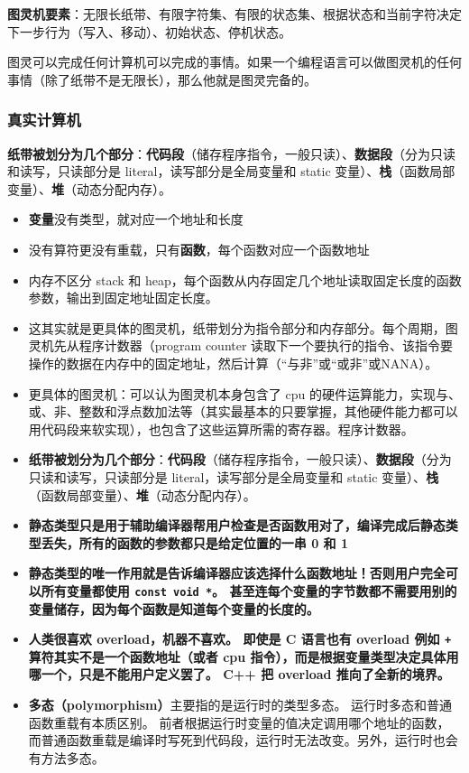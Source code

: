 
\begin{issues}
\issueDraft
\end{issues}


\textbf{图灵机要素}：无限长纸带、有限字符集、有限的状态集、根据状态和当前字符决定下一步行为（写入、移动）、初始状态、停机状态。

图灵可以完成任何计算机可以完成的事情。如果一个编程语言可以做图灵机的任何事情（除了纸带不是无限长），那么他就是图灵完备的。

\subsubsection{真实计算机}
\textbf{纸带被划分为几个部分}：\textbf{代码段}（储存程序指令，一般只读）、\textbf{数据段}（分为只读和读写，只读部分是 literal，读写部分是全局变量和 static 变量）、\textbf{栈}（函数局部变量）、\textbf{堆}（动态分配内存）。

\begin{itemize}
\item \textbf{变量}没有类型，就对应一个地址和长度
\item 没有算符更没有重载，只有\textbf{函数}，每个函数对应一个函数地址
\item 内存不区分 stack 和 heap，每个函数从内存固定几个地址读取固定长度的函数参数，输出到固定地址固定长度。
\item 这其实就是更具体的图灵机，纸带划分为指令部分和内存部分。每个周期，图灵机先从程序计数器（program counter 读取下一个要执行的指令、该指令要操作的数据在内存中的固定地址，然后计算（“与非”或“或非”或NANA）。
\item 更具体的图灵机：可以认为图灵机本身包含了 cpu 的硬件运算能力，实现与、或、非、整数和浮点数加法等（其实最基本的只要掌握，其他硬件能力都可以用代码段来软实现），也包含了这些运算所需的寄存器。程序计数器。
\item \textbf{纸带被划分为几个部分}：\textbf{代码段}（储存程序指令，一般只读）、\textbf{数据段}（分为只读和读写，只读部分是 literal，读写部分是全局变量和 static 变量）、\textbf{栈}（函数局部变量）、\textbf{堆}（动态分配内存）。
\item \textbf{静态类型只是用于辅助编译器帮用户检查是否函数用对了，编译完成后静态类型丢失，所有的函数的参数都只是给定位置的一串 0 和 1}
\item \textbf{静态类型的唯一作用就是告诉编译器应该选择什么函数地址！否则用户完全可以所有变量都使用 \verb`const void *`。 甚至连每个变量的字节数都不需要用别的变量储存，因为每个函数是知道每个变量的长度的。}
\item \textbf{人类很喜欢 overload，机器不喜欢。 即使是 C 语言也有 overload 例如 \verb`+` 算符其实不是一个函数地址（或者 cpu 指令），而是根据变量类型决定具体用哪一个，只是不能用户定义罢了。 C++ 把 overload 推向了全新的境界。}
\item \textbf{多态（polymorphism）}主要指的是运行时的类型多态。 运行时多态和普通函数重载有本质区别。 前者根据运行时变量的值决定调用哪个地址的函数，而普通函数重载是编译时写死到代码段，运行时无法改变。另外，运行时也会有方法多态。
\end{itemize}
